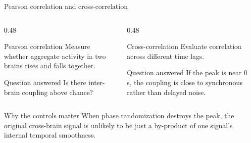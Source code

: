 \documentclass[aspectratio=169,11pt]{beamer}
\begin{document}
\begin{frame}{Pearson correlation and cross-correlation}
\begin{columns}[T]
  \begin{column}{0.48\textwidth}
    \begin{block}{Pearson correlation}
    Measure whether aggregate activity in two brains rises and falls together.
    \end{block}
    \begin{block}{Question answered}
    Is there inter-brain coupling above chance?
    \end{block}
  \end{column}
  \begin{column}{0.48\textwidth}
    \begin{block}{Cross-correlation}
    Evaluate correlation across different time lags.
    \end{block}
    \begin{block}{Question answered}
    If the peak is near 0 s, the coupling is close to synchronous rather than delayed noise.
    \end{block}
  \end{column}
\end{columns}
\vspace{0.4em}
\begin{alertblock}{Why the controls matter}
When phase randomization destroys the peak, the original cross-brain signal is unlikely to be just a by-product of one signal's internal temporal smoothness.
\end{alertblock}
\end{frame}
\end{document}
